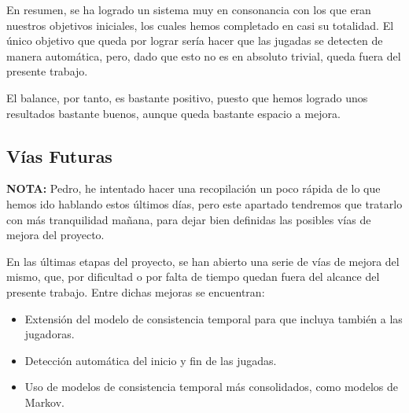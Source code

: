 En resumen, se ha logrado un sistema muy en consonancia con los que eran nuestros objetivos iniciales, los cuales hemos completado en casi su totalidad. El único objetivo que queda por lograr sería hacer que las jugadas se detecten de manera automática, pero, dado que esto no es en absoluto trivial, queda fuera del presente trabajo. 

El balance, por tanto, es bastante positivo, puesto que hemos logrado unos resultados bastante buenos, aunque queda bastante espacio a mejora.

\subsection{Vías Futuras}

\textbf{NOTA:} Pedro, he intentado hacer una recopilación un poco rápida de lo que hemos ido hablando estos últimos días, pero este apartado tendremos que tratarlo con más tranquilidad mañana, para dejar bien definidas las posibles vías de mejora del proyecto.

En las últimas etapas del proyecto, se han abierto una serie de vías de mejora del mismo, que, por dificultad o por falta de tiempo quedan fuera del alcance del presente trabajo. Entre dichas mejoras se encuentran:
\begin{itemize}
    \item Extensión del modelo de consistencia temporal para que incluya también a las jugadoras.
    \item Detección automática del inicio y fin de las jugadas. 
    \item Uso de modelos de consistencia temporal más consolidados, como modelos de Markov.
\end{itemize}